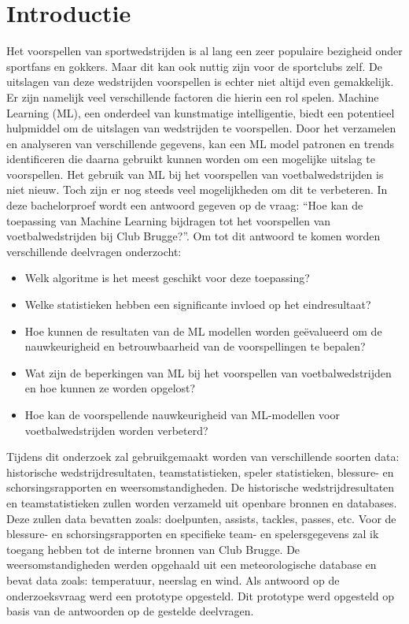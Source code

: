 
\section{Introductie}%
\label{sec:introductie}

Het voorspellen van sportwedstrijden is al lang een zeer populaire bezigheid onder sportfans en gokkers. Maar dit kan ook nuttig zijn voor de sportclubs zelf. De uitslagen van deze wedstrijden voorspellen is echter niet altijd even gemakkelijk. Er zijn namelijk veel verschillende factoren die hierin een rol spelen.
Machine Learning (ML), een onderdeel van kunstmatige intelligentie, biedt een potentieel hulpmiddel om de uitslagen van wedstrijden te voorspellen. Door het verzamelen en analyseren van verschillende gegevens, kan een ML model patronen en trends identificeren die daarna gebruikt kunnen worden om een mogelijke uitslag te voorspellen.
Het gebruik van ML bij het voorspellen van voetbalwedstrijden is niet nieuw. Toch zijn er nog steeds veel mogelijkheden om dit te verbeteren. In deze bachelorproef wordt een antwoord gegeven op de vraag: “Hoe kan de toepassing van Machine Learning bijdragen tot het voorspellen van voetbalwedstrijden bij Club Brugge?”. Om tot dit antwoord te komen worden verschillende deelvragen onderzocht:

\begin{itemize}
  \item Welk algoritme is het meest geschikt voor deze toepassing?
  \item Welke statistieken hebben een significante invloed op het eindresultaat?
  \item Hoe kunnen de resultaten van de ML modellen worden geëvalueerd om de nauwkeurigheid en betrouwbaarheid van de voorspellingen te bepalen?
  \item Wat zijn de beperkingen van ML bij het voorspellen van voetbalwedstrijden en hoe kunnen ze worden opgelost?
  \item Hoe kan de voorspellende nauwkeurigheid van ML-modellen voor voetbalwedstrijden worden verbeterd?
\end{itemize}

Tijdens dit onderzoek zal gebruikgemaakt worden van verschillende soorten data: historische wedstrijdresultaten, teamstatistieken, speler statistieken, blessure- en schorsingsrapporten en weersomstandigheden. De historische wedstrijdresultaten en teamstatistieken zullen worden verzameld uit openbare bronnen en databases. Deze zullen data bevatten zoals: doelpunten, assists, tackles, passes, etc. Voor de blessure- en schorsingsrapporten en specifieke team- en spelersgegevens zal ik toegang hebben tot de interne bronnen van Club Brugge. De weersomstandigheden werden opgehaald uit een meteorologische database en bevat data zoals: temperatuur, neerslag en wind.
Als antwoord op de onderzoeksvraag werd een prototype opgesteld. Dit prototype werd opgesteld op basis van de antwoorden op de gestelde deelvragen.

